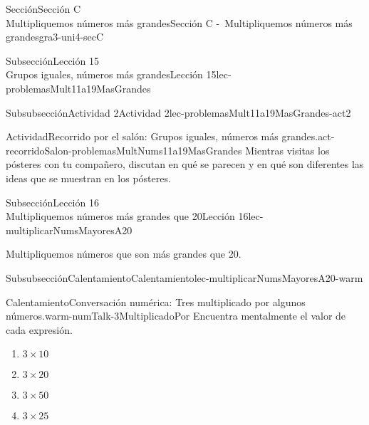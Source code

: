 \begin{sectionptx}{Sección}{{\Large Sección C\\}Multipliquemos números más grandes}{}{Sección C -~Multipliquemos números más grandes}{}{}{gra3-uni4-secC}
\begin{subsectionptx}{Subsección}{{\normalsize Lección 15\\[-0.05cm]}Grupos iguales, números más grandes}{}{Lección 15}{}{}{lec-problemasMult11a19MasGrandes}
\typeout{************************************************}
%
\begin{subsubsectionptx}{Subsubsección}{Actividad 2}{}{Actividad 2}{}{}{lec-problemasMult11a19MasGrandes-act2}
\begin{activity}{Actividad}{Recorrido por el salón: Grupos iguales, números más grandes.}{act-recorridoSalon-problemasMultNums11a19MasGrandes}%
Mientras visitas los pósteres con tu compañero, discutan en qué se parecen y en qué son diferentes las ideas que se muestran en los pósteres.%
\end{activity}%
\end{subsubsectionptx}
\end{subsectionptx}
%
%
\typeout{************************************************}
\typeout{************************************************}
%
\begin{subsectionptx}{Subsección}{{\normalsize Lección 16\\[-0.05cm]}Multipliquemos números más grandes que 20}{}{Lección 16}{}{}{lec-multiplicarNumsMayoresA20}
\begin{introduction}{}%
Multipliquemos números que son más grandes que 20.%
\end{introduction}%
%
%
\typeout{************************************************}
\typeout{************************************************}
%
\begin{subsubsectionptx}{Subsubsección}{Calentamiento}{}{Calentamiento}{}{}{lec-multiplicarNumsMayoresA20-warm}
\begin{exploration}{Calentamiento}{Conversación numérica: Tres multiplicado por algunos números.}{warm-numTalk-3MultiplicadoPor}%
Encuentra mentalmente el valor de cada expresión.%
%
\begin{enumerate}[label={\Alph*.}]
\item{}\(\displaystyle 3\times 10\)%
\item{}\(\displaystyle 3\times 20\)%
\item{}\(\displaystyle 3\times 50\)%
\item{}\(\displaystyle 3\times 25\)%
\end{enumerate}
\end{exploration}%
\end{subsubsectionptx}
%
%
\typeout{************************************************}
\typeout{************************************************}

\end{subsectionptx}
\end{sectionptx}
